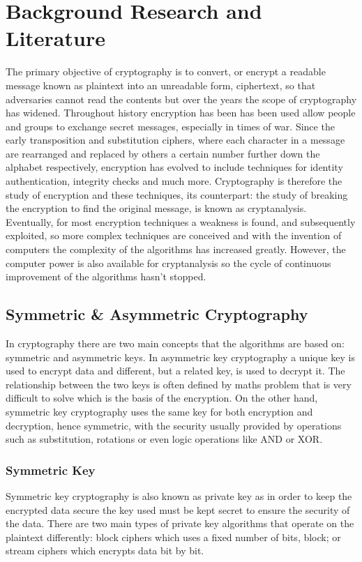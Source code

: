 \documentclass[12pt,twoside,a4paper]{report}
\begin{document}
    \chapter{Background Research and Literature}
    The primary objective of cryptography is to convert, or encrypt a readable message known as plaintext into an unreadable form, ciphertext, so that adversaries cannot read the contents  but over the years the scope of cryptography has widened. Throughout history encryption has been has been used allow people and groups to exchange secret messages, especially in times of war. Since the early transposition and substitution ciphers, where each character in a message are rearranged and replaced by others a certain number further down the alphabet respectively, encryption has evolved to include techniques for identity authentication, integrity checks and much more. Cryptography is therefore the study of encryption and these techniques, its counterpart: the study of breaking the encryption to find the original message, is known as cryptanalysis. Eventually, for most encryption techniques a weakness is found, and subsequently exploited, so more complex techniques are conceived and with the invention of computers the complexity of the algorithms has increased greatly. However, the computer power is also available for cryptanalysis so the cycle of continuous improvement of the algorithms hasn't stopped.
    
    \section{Symmetric \& Asymmetric Cryptography}
    In cryptography there are two main concepts that the algorithms are based on: symmetric and asymmetric keys. In asymmetric key cryptography a unique key is used to encrypt data and different, but a related key, is used to decrypt it. The relationship between the two keys is often defined by maths problem that is very difficult to solve which is the basis of the encryption. On the other hand, symmetric key cryptography uses the same key for both encryption and decryption, hence symmetric, with the security usually provided by operations such as substitution, rotations or even logic operations like AND or XOR.
    
    \subsection{Symmetric Key}
    Symmetric key cryptography is also known as private key as in order to keep the encrypted data secure the key used must be kept secret to ensure the security of the data. There are two main types of private key algorithms that operate on the plaintext differently: block ciphers which uses a fixed number of bits, block; or stream ciphers which encrypts data bit by bit.
    
\end{document}

